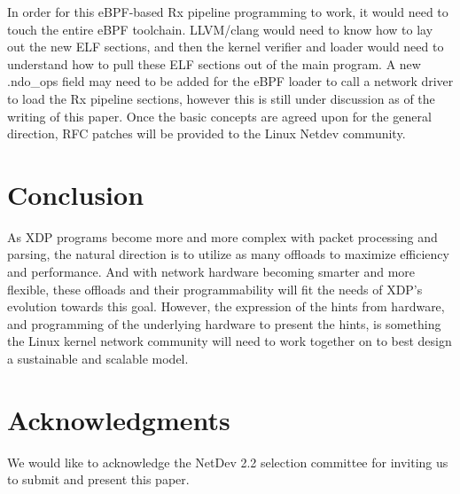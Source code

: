 \documentclass[letterpaper]{article}
\begin{document}
\indent In order for this eBPF-based Rx pipeline programming to work, it would need to touch the entire eBPF toolchain. LLVM/clang would need to know how to lay out the new ELF sections, and then the kernel verifier and loader would need to understand how to pull these ELF sections out of the main program. A new .ndo\_ops field may need to be added for the eBPF loader to call a network driver to load the Rx pipeline sections, however this is still under discussion as of the writing of this paper. Once the basic concepts are agreed upon for the general direction, RFC patches will be provided to the Linux Netdev community.

\section{Conclusion}
As XDP programs become more and more complex with packet processing and parsing, the natural direction is to utilize as many offloads to maximize efficiency and performance. And with network hardware becoming smarter and more flexible, these offloads and their programmability will fit the needs of XDP's evolution towards this goal. However, the expression of the hints from hardware, and programming of the underlying hardware to present the hints, is something the Linux kernel network community will need to work together on to best design a sustainable and scalable model.

\section{Acknowledgments}
We would like to acknowledge the NetDev 2.2 selection committee for inviting us to submit and present this paper.



\end{document}
